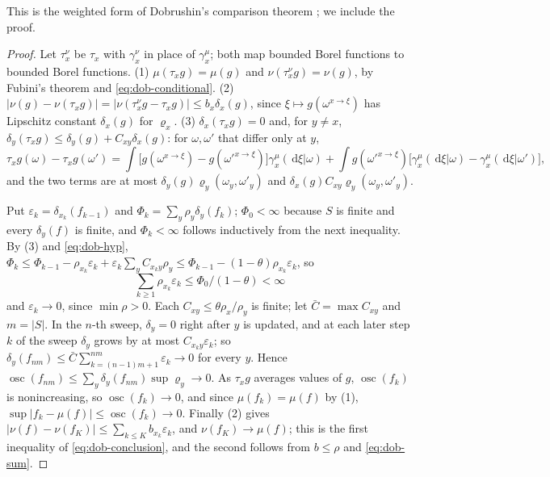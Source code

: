 \documentclass[11pt,a4paper]{amsart}
\theoremstyle{definition}
\theoremstyle{remark}
\numberwithin{equation}{section}
\DeclareMathOperator{\osc}{osc}      %
\newcommand{\abs}[1]{\lvert #1\rvert}      %
\newcommand{\dd}{\,\mathrm{d}}             %
\begin{document}
This is the weighted form of Dobrushin's comparison theorem \cite{dobrushin1970,follmer1982,kunsch1982}; we include the proof.

\begin{proof}
Let $\tau^\nu_x$ be $\tau_x$ with $\gamma^\nu_x$ in place of $\gamma^\mu_x$; both map bounded Borel functions to bounded Borel functions. (1) $\mu(\tau_xg)=\mu(g)$ and $\nu(\tau^\nu_xg)=\nu(g)$, by Fubini's theorem and \eqref{eq:dob-conditional}. (2) $\abs{\nu(g)-\nu(\tau_xg)}=\abs{\nu(\tau^\nu_xg-\tau_xg)}\le b_x\delta_x(g)$, since $\xi\mapsto g(\omega^{x\to\xi})$ has Lipschitz constant $\delta_x(g)$ for $\varrho_x$. (3) $\delta_x(\tau_xg)=0$ and, for $y\neq x$, $\delta_y(\tau_xg)\le\delta_y(g)+C_{xy}\delta_x(g)$: for $\omega,\omega'$ that differ only at $y$,
\[
\tau_xg(\omega)-\tau_xg(\omega')=\int\bigl[g(\omega^{x\to\xi})-g(\omega'^{x\to\xi})\bigr]\gamma^\mu_x(\dd\xi|\omega)+\int g(\omega'^{x\to\xi})\bigl[\gamma^\mu_x(\dd\xi|\omega)-\gamma^\mu_x(\dd\xi|\omega')\bigr],
\]
and the two terms are at most $\delta_y(g)\varrho_y(\omega_y,\omega'_y)$ and $\delta_x(g)C_{xy}\varrho_y(\omega_y,\omega'_y)$.

Put $\varepsilon_k=\delta_{x_k}(f_{k-1})$ and $\Phi_k=\sum_y\rho_y\delta_y(f_k)$; $\Phi_0<\infty$ because $S$ is finite and every $\delta_y(f)$ is finite, and $\Phi_k<\infty$ follows inductively from the next inequality. By (3) and \eqref{eq:dob-hyp}, $\Phi_k\le\Phi_{k-1}-\rho_{x_k}\varepsilon_k+\varepsilon_k\sum_yC_{x_ky}\rho_y\le\Phi_{k-1}-(1-\theta)\rho_{x_k}\varepsilon_k$, so
\begin{equation}\label{eq:dob-sum}
\textstyle\sum_{k\ge1}\rho_{x_k}\varepsilon_k\le\Phi_0/(1-\theta)<\infty
\end{equation}
and $\varepsilon_k\to0$, since $\min\rho>0$. Each $C_{xy}\le\theta\rho_x/\rho_y$ is finite; let $\bar C=\max C_{xy}$ and $m=\abs S$. In the $n$-th sweep, $\delta_y=0$ right after $y$ is updated, and at each later step $k$ of the sweep $\delta_y$ grows by at most $C_{x_ky}\varepsilon_k$; so $\delta_y(f_{nm})\le\bar C\sum_{k=(n-1)m+1}^{nm}\varepsilon_k\to0$ for every $y$. Hence $\osc(f_{nm})\le\sum_y\delta_y(f_{nm})\sup\varrho_y\to0$. As $\tau_xg$ averages values of $g$, $\osc(f_k)$ is nonincreasing, so $\osc(f_k)\to0$, and since $\mu(f_k)=\mu(f)$ by (1), $\sup\abs{f_k-\mu(f)}\le\osc(f_k)\to0$. Finally (2) gives $\abs{\nu(f)-\nu(f_K)}\le\sum_{k\le K}b_{x_k}\varepsilon_k$, and $\nu(f_K)\to\mu(f)$; this is the first inequality of \eqref{eq:dob-conclusion}, and the second follows from $b\le\rho$ and \eqref{eq:dob-sum}.
\end{proof}
\end{document}
